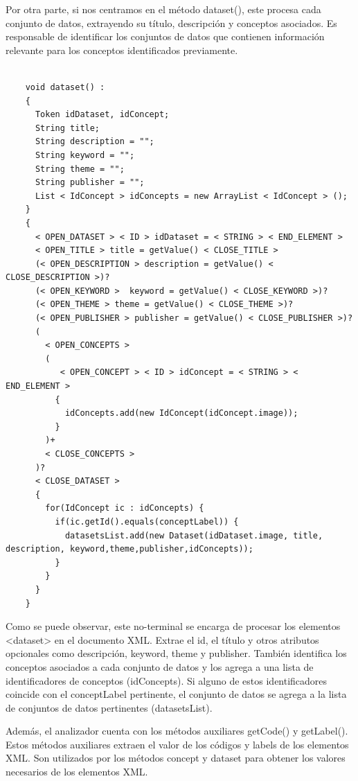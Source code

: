 Por otra parte, si nos centramos en el método dataset(), este  procesa cada conjunto de datos, extrayendo su título, descripción y conceptos asociados. Es responsable de identificar los conjuntos de datos que contienen información relevante para los conceptos identificados previamente.

\lstset{inputencoding=utf8/latin1}
\begin{lstlisting}
    
    void dataset() :
    {
      Token idDataset, idConcept;
      String title;
      String description = "";
      String keyword = "";
      String theme = "";
      String publisher = "";
      List < IdConcept > idConcepts = new ArrayList < IdConcept > ();
    } 
    {
      < OPEN_DATASET > < ID > idDataset = < STRING > < END_ELEMENT > 
      < OPEN_TITLE > title = getValue() < CLOSE_TITLE > 
      (< OPEN_DESCRIPTION > description = getValue() < CLOSE_DESCRIPTION >)?
      (< OPEN_KEYWORD >  keyword = getValue() < CLOSE_KEYWORD >)?
      (< OPEN_THEME > theme = getValue() < CLOSE_THEME >)?
      (< OPEN_PUBLISHER > publisher = getValue() < CLOSE_PUBLISHER >)?
      (
        < OPEN_CONCEPTS >
        (
           < OPEN_CONCEPT > < ID > idConcept = < STRING > < END_ELEMENT >
          {
            idConcepts.add(new IdConcept(idConcept.image));
          }
        )+
        < CLOSE_CONCEPTS >
      )?
      < CLOSE_DATASET >
      {
        for(IdConcept ic : idConcepts) {
          if(ic.getId().equals(conceptLabel)) {
            datasetsList.add(new Dataset(idDataset.image, title, description, keyword,theme,publisher,idConcepts));
          }
        }
      }
    }   
\end{lstlisting}

Como se puede observar, este no-terminal se encarga de procesar los elementos <dataset> en el documento XML. Extrae el id, el título y otros atributos opcionales como descripción, keyword, theme y publisher. También identifica los conceptos asociados a cada conjunto de datos y los agrega a una lista de identificadores de conceptos (idConcepts). Si alguno de estos identificadores coincide con el conceptLabel pertinente, el conjunto de datos se agrega a la lista de conjuntos de datos pertinentes (datasetsList).

Además, el analizador cuenta con los métodos auxiliares getCode()  y getLabel(). Estos métodos auxiliares extraen el valor de los códigos y labels de los elementos XML. Son utilizados por los métodos concept y dataset para obtener los valores necesarios de los elementos XML.

